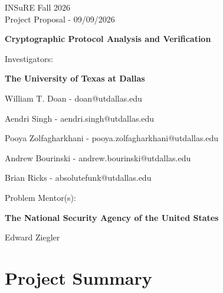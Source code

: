 \documentclass[11pt]{article}
\begin{document}
\begin{titlepage}
\centering
\vspace*{2cm}
{\normalsize INSuRE Fall 2026\\Project Proposal - 09/09/2026\par}
\vspace{1cm}
{\Huge\bfseries Cryptographic Protocol Analysis and Verification\par}
\vspace{25em}
Investigators:\par
\vspace{0.4cm}
\textbf{The University of Texas at Dallas}\par
William T. Doan - doan@utdallas.edu\par
Aendri Singh - aendri.singh@utdallas.edu\par
Pooya Zolfagharkhani - pooya.zolfagharkhani@utdallas.edu\par
Andrew Bourinski - andrew.bourinski@utdallas.edu\par
Brian Ricks - absolutefunk@utdallas.edu\par
\vspace{0.7cm}
Problem Mentor(s):\par
\vspace{0.4cm}
\textbf{The National Security Agency of the United States}\par
Edward Ziegler\par
\vfill
\end{titlepage}

\tableofcontents
\newpage

\section{Project Summary} 
\end{document}
